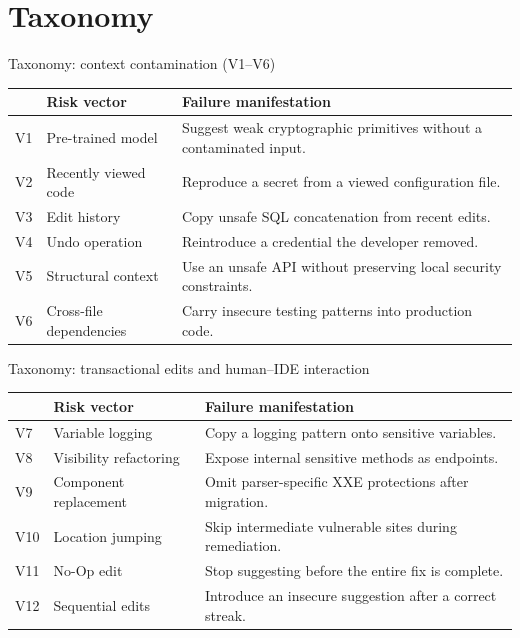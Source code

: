 \section{Taxonomy}
\begin{frame}{Taxonomy: context contamination (V1--V6)}
\footnotesize
\begin{tabularx}{\textwidth}{@{}p{.7cm}p{4.3cm}X@{}}
\toprule
 & \textbf{Risk vector} & \textbf{Failure manifestation}\\\midrule
V1 & Pre-trained model & Suggest weak cryptographic primitives without a contaminated input.\\[5pt]
V2 & Recently viewed code & Reproduce a secret from a viewed configuration file.\\[5pt]
V3 & Edit history & Copy unsafe SQL concatenation from recent edits.\\[5pt]
V4 & Undo operation & Reintroduce a credential the developer removed.\\[5pt]
V5 & Structural context & Use an unsafe API without preserving local security constraints.\\[5pt]
V6 & Cross-file dependencies & Carry insecure testing patterns into production code.\\\bottomrule
\end{tabularx}
\end{frame}

\begin{frame}{Taxonomy: transactional edits and human--IDE interaction}
\footnotesize
\begin{tabularx}{\textwidth}{@{}p{.7cm}p{4.3cm}X@{}}
\toprule
 & \textbf{Risk vector} & \textbf{Failure manifestation}\\\midrule
V7 & Variable logging & Copy a logging pattern onto sensitive variables.\\[5pt]
V8 & Visibility refactoring & Expose internal sensitive methods as endpoints.\\[5pt]
V9 & Component replacement & Omit parser-specific XXE protections after migration.\\\midrule
V10 & Location jumping & Skip intermediate vulnerable sites during remediation.\\[5pt]
V11 & No-Op edit & Stop suggesting before the entire fix is complete.\\[5pt]
V12 & Sequential edits & Introduce an insecure suggestion after a correct streak.\\\bottomrule
\end{tabularx}
\end{frame}
